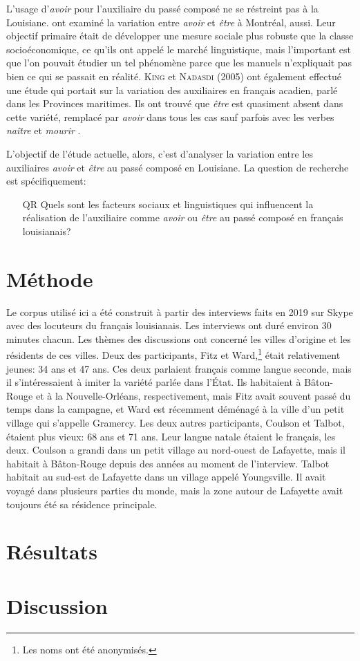 \documentclass{article}
\newcommand{\lexi}[1]{\textit{#1}}
\newcommand{\name}[1]{\textsc{#1}}
\begin{document}
    L'usage d'\lexi{avoir} pour l'auxiliaire du passé composé ne se réstreint pas à la Louisiane.
    \textcite{sankoff_linguistic_1978} ont examiné la variation entre \lexi{avoir} et \lexi{être} à Montréal, aussi.
    Leur objectif primaire était de développer une mesure sociale plus robuste que la classe socioéconomique, ce qu'ils ont appelé le marché linguistique, mais l'important est que l'on pouvait étudier un tel phénomène parce que les manuels n'expliquait pas bien ce qui se passait en réalité.
    \name{King} et \name{Nadasdi} (2005) ont également effectué une étude qui portait sur la variation des auxiliaires en français acadien, parlé dans les Provinces maritimes.
    Ils ont trouvé que \lexi{être} est quasiment absent dans cette variété, remplacé par \lexi{avoir} dans tous les cas sauf parfois avec les verbes \lexi{naître} et \lexi{mourir} \parencite[\name{King} et \name{Nadasdi}, 2005, cité dans][p.~325]{comeau_new_2012}.

    L'objectif de l'étude actuelle, alors, c'est d'analyser la variation entre les auxiliaires \lexi{avoir} et \lexi{être} au passé composé en Louisiane.
    La question de recherche est spécifiquement:

    \begin{itemize}
      \item[QR] Quels sont les facteurs sociaux et linguistiques qui influencent la réalisation de l'auxiliaire comme \lexi{avoir} ou \lexi{être} au passé composé en français louisianais?
    \end{itemize}

  \section{Méthode}
    Le corpus utilisé ici a été construit à partir des interviews faits en 2019 sur Skype avec des locuteurs du français louisianais.
    Les interviews ont duré environ 30 minutes chacun.
    Les thèmes des discussions ont concerné les villes d'origine et les résidents de ces villes.
    Deux des participants, Fitz et Ward,\footnote{Les noms ont été anonymisés.} était relativement jeunes: 34 ans et 47 ans.
    Ces deux parlaient français comme langue seconde, mais il s'intéressaient à imiter la variété parlée dans l'État.
    Ils habitaient à Bâton-Rouge et à la Nouvelle-Orléans, respectivement, mais Fitz avait souvent passé du temps dans la campagne, et Ward est récemment déménagé à la ville d'un petit village qui s'appelle Gramercy.
    Les deux autres participants, Coulson et Talbot, étaient plus vieux: 68 ans et 71 ans.
    Leur langue natale étaient le français, les deux.
    Coulson a grandi dans un petit village au nord-ouest de Lafayette, mais il habitait à Bâton-Rouge depuis des années au moment de l'interview.
    Talbot habitait au sud-est de Lafayette dans un village appelé Youngsville.
    Il avait voyagé dans plusieurs parties du monde, mais la zone autour de Lafayette avait toujours été sa résidence principale.
  \section{Résultats}
  \section{Discussion}
  \printbibliography
\end{document}
